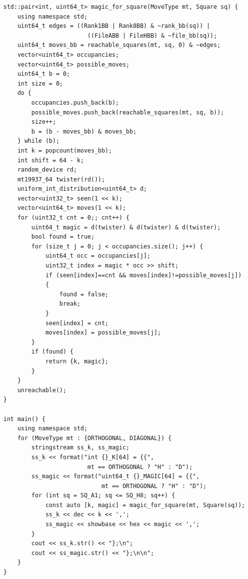 \documentclass[12pt,a4paper,twoside,openright]{book}
\begin{document}
\begin{mdframed}[skipabove=\baselineskip,hidealllines=true]
\begin{verbatim}
std::pair<int, uint64_t> magic_for_square(MoveType mt, Square sq) {    
    using namespace std;
    uint64_t edges = ((Rank1BB | Rank8BB) & ~rank_bb(sq)) | 
                        ((FileABB | FileHBB) & ~file_bb(sq));
    uint64_t moves_bb = reachable_squares(mt, sq, 0) & ~edges;
    vector<uint64_t> occupancies;
    vector<uint64_t> possible_moves;
    uint64_t b = 0;
    int size = 0;
    do {
        occupancies.push_back(b);
        possible_moves.push_back(reachable_squares(mt, sq, b));
        size++;
        b = (b - moves_bb) & moves_bb;
    } while (b);
    int k = popcount(moves_bb);
    int shift = 64 - k;                
    random_device rd;
    mt19937_64 twister(rd());
    uniform_int_distribution<uint64_t> d;
    vector<uint32_t> seen(1 << k);
    vector<uint64_t> moves(1 << k);                    
    for (uint32_t cnt = 0;; cnt++) {
        uint64_t magic = d(twister) & d(twister) & d(twister);
        bool found = true;                    
        for (size_t j = 0; j < occupancies.size(); j++) {
            uint64_t occ = occupancies[j];
            uint32_t index = magic * occ >> shift;
            if (seen[index]==cnt && moves[index]!=possible_moves[j]) 
            {
                found = false;
                break;
            }
            seen[index] = cnt;
            moves[index] = possible_moves[j];
        }
        if (found) {
            return {k, magic};
        }
    }
    unreachable();
}

int main() {
    using namespace std;
    for (MoveType mt : {ORTHOGONAL, DIAGONAL}) {
        stringstream ss_k, ss_magic;
        ss_k << format("int {}_K[64] = {{",
                        mt == ORTHOGONAL ? "H" : "D");
        ss_magic << format("uint64_t {}_MAGIC[64] = {{",
                            mt == ORTHOGONAL ? "H" : "D");
        for (int sq = SQ_A1; sq <= SQ_H8; sq++) {
            const auto [k, magic] = magic_for_square(mt, Square(sq));
            ss_k << dec << k << ',';
            ss_magic << showbase << hex << magic << ',';
        }
        cout << ss_k.str() << "};\n";
        cout << ss_magic.str() << "};\n\n";
    }
}
\end{verbatim}
\label{lst:find_magic}
\end{mdframed} 
\end{document}
